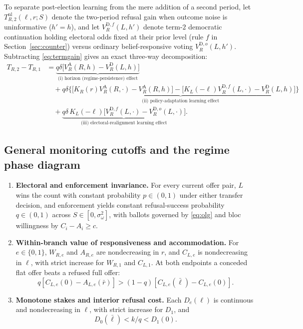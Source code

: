 \documentclass[11pt,letterpaper]{article}
\newcommand{\D}{\mathrm D}
\newcommand{\A}{\mathrm A}
\begin{document}
To separate post-election learning from the mere addition of a second period, let $T_{R,2}^{\mathrm{nl}}(\ell,r;S)$ denote the two-period refusal gain when outcome noise is uninformative ($h'=h$), and let $V_R^{\D,f}(L,h')$ denote term-$2$ democratic continuation holding electoral odds fixed at their prior level (rule $f$ in Section~\ref{sec:counter}) versus ordinary belief-responsive voting $V_R^{\D,o}(L,h')$. Subtracting \eqref{eq:termgain} gives an exact three-way decomposition:
\begin{align}
 T_{R,2}-T_{R,1}
 &=\underbrace{q\delta\big[V_R^\A(R,h)-V_R^\D(L,h)\big]}_{\text{(i) horizon (regime-persistence) effect}}\nonumber\\
 &\quad+\underbrace{q\delta\Big\{\big[K_R(r)V_R^\A(R,\cdot)-V_R^\A(R,h)\big]-\big[K_L(-\ell)V_R^{\D,f}(L,\cdot)-V_R^\D(L,h)\big]\Big\}}_{\text{(ii) policy-adaptation learning effect}}\nonumber\\
 &\quad+\underbrace{q\delta\,K_L(-\ell)\big[V_R^{\D,f}(L,\cdot)-V_R^{\D,o}(L,\cdot)\big]}_{\text{(iii) electoral-realignment learning effect}}.
 \label{eq:threedecomp}
\end{align}

\subsection{General monitoring cutoffs and the regime phase diagram}

\begin{enumerate}
\item \textbf{Electoral and enforcement invariance.} For every current offer pair, $L$ wins the count with constant probability $p\in(0,1)$ under either transfer decision, and enforcement yields constant refusal-success probability $q\in(0,1)$ across $S\in[0,\sigma_\omega^2]$, with ballots governed by \eqref{eq:olg} and bloc willingness by $C_i-A_i\ge c$.
\item \textbf{Within-branch value of responsiveness and accommodation.} For $e\in\{0,1\}$, $W_{R,e}$ and $A_{R,e}$ are nondecreasing in $r$, and $C_{L,e}$ is nondecreasing in $\ell$, with strict increase for $W_{R,1}$ and $C_{L,1}$. At both endpoints a conceded flat offer beats a refused full offer:
\begin{equation}
 q[C_{L,e}(0)-A_{L,e}(\bar r)]>
 (1-q)[C_{L,e}(\bar\ell)-C_{L,e}(0)] .
 \label{eq:accommodate}
\end{equation}
\item \textbf{Monotone stakes and interior refusal cost.} Each $D_e(\ell)$ is continuous and nondecreasing in $\ell$, with strict increase for $D_1$, and
\begin{equation}
 D_0(\bar\ell)<k/q<D_1(0).
 \label{eq:costwindow}
\end{equation}
\end{enumerate}
\end{document}
